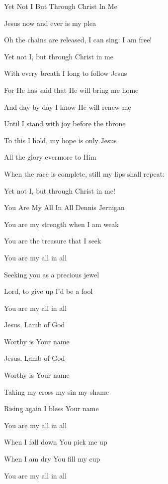 \documentclass[12pt]{book}
\begin{document}
\begin{song}{Yet Not I But Through Christ In Me}{}
\begin{SBOpGroup}
    Jesus now and ever is my plea

    Oh the chains are released, I can sing: I am free!

    Yet not I, but through Christ in me
  \end{SBOpGroup}

  \begin{SBVerse}
    With every breath I long to follow Jesus

    For He has said that He will bring me home

    And day by day I know He will renew me

    Until I stand with joy before the throne
  \end{SBVerse}

  \begin{SBOpGroup}
    To this I hold, my hope is only Jesus

    All the glory evermore to Him

    When the race is complete, still my lips shall repeat:

    Yet not I, but through Christ in me!
  \end{SBOpGroup}
\end{song}

\begin{song}{You Are My All In All}{}
  {}
  {Dennis Jernigan}
  {}
  {}

  \begin{SBVerse}
    You are my strength when I am weak

    You are the treasure that I seek

    You are my all in all

    Seeking you as a precious jewel

    Lord, to give up I'd be a fool

    You are my all in all

  \end{SBVerse}

  \begin{SBOpGroup}
    Jesus, Lamb of God

    Worthy is Your name

    Jesus, Lamb of God

    Worthy is Your name

  \end{SBOpGroup}

  \begin{SBVerse}
    Taking my cross my sin my shame

    Rising again I bless Your name

    You are my all in all

    When I fall down You pick me up

    When I am dry You fill my cup

    You are my all in all
  \end{SBVerse}
\end{song}
\end{document}
